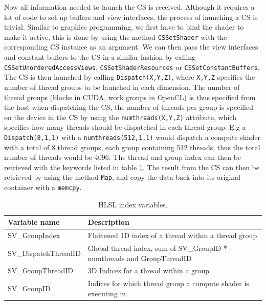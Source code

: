 Now all information needed to launch the CS is received. Although it requires a lot of code to set up buffers and view interfaces, the process of launching a CS is trivial. Similar to graphics programming, we first have to bind the shader to make it active, this is done by using the method \lstinline{CSSetShader} with the corresponding CS instance as an argument. We can then pass the view interfaces and constant buffers to the CS in a similar fashion by calling \lstinline{CSSetUnorderedAccessViews}, \lstinline{CSSetShaderResources} or \lstinline{CSSetConstantBuffers}. The CS is then launched by calling \lstinline{Dispatch(X,Y,Z)}, where \lstinline{X,Y,Z} specifies the number of thread groups to be launched in each dimension. The number of thread groups (blocks in CUDA, work groups in OpenCL) is thus specified from the host when dispatching the CS, the number of threads per group is specified on the device in the CS by using the \lstinline{numthreads(X,Y,Z)} attribute, which specifies how many threads should be dispatched in each thread group. E.g a \lstinline{Dispatch(8,1,1)} with a \lstinline{numthreads(512,1,1)} would dispatch a compute shader with a total of 8 thread groups, each group containing 512 threads, thus the total number of threads would be 4096. The thread and group index can then be retrieved with the keywords listed in table \ref{tab:HLSLIndexKeywords}.
The result from the CS can then be retrieved by using the method \lstinline{Map}, and copy the data back into its original container with a \lstinline{memcpy}. 

\begin{table}
    \begin{tabularx}{\textwidth}{ |X|X| }
      \hline
      \rowcolor{gray}
      \textbf{Variable name}    & \textbf{Description}  \\ \hline                         
      SV\_GroupIndex            & Flattened 1D index of a thread within a thread group \\ \hline
      SV\_DispatchThreadID      & Global thread index, sum of SV\_GroupID * numthreads and GroupThreadID            \\ \hline
      SV\_GroupThreadID         & 3D Indices for a thread within a group \\ \hline
      SV\_GroupID               & Indices for which thread group a compute shader is executing in \\ \hline
    \end{tabularx}
\caption{\label{tab:HLSLIndexKeywords} HLSL index variables.}
\end{table}

